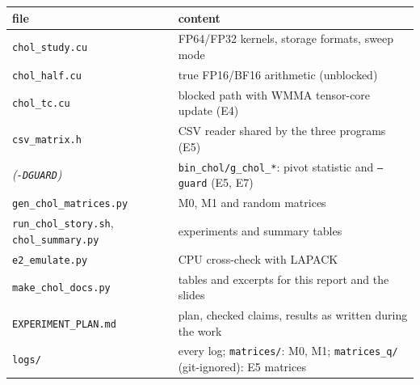 \documentclass[11pt,a4paper]{article}
\begin{document}
\begin{center}\small
\begin{tabular}{ll}
\toprule
file & content\\
\midrule
\texttt{chol\_study.cu} & FP64/FP32 kernels, storage formats, sweep mode\\
\texttt{chol\_half.cu} & true FP16/BF16 arithmetic (unblocked)\\
\texttt{chol\_tc.cu} & blocked path with WMMA tensor-core update (E4)\\
\texttt{csv\_matrix.h} & CSV reader shared by the three programs (E5)\\
\textit{(\texttt{-DGUARD})} & \texttt{bin\_chol/g\_chol\_*}: pivot statistic and \texttt{--guard} (E5, E7)\\
\texttt{gen\_chol\_matrices.py} & M0, M1 and random matrices\\
\texttt{run\_chol\_story.sh}, \texttt{chol\_summary.py} & experiments and summary tables\\
\texttt{e2\_emulate.py} & CPU cross-check with LAPACK\\
\texttt{make\_chol\_docs.py} & tables and excerpts for this report and the slides\\
\texttt{EXPERIMENT\_PLAN.md} & plan, checked claims, results as written during the work\\
\texttt{logs/} & every log; \texttt{matrices/}: M0, M1; \texttt{matrices\_q/} (git-ignored): E5 matrices\\
\bottomrule
\end{tabular}
\end{center}
\end{document}
